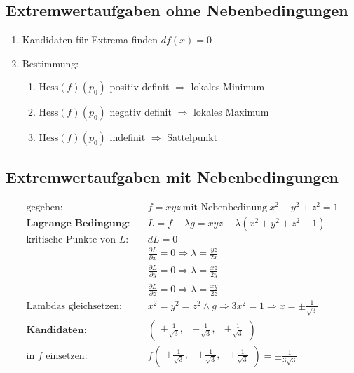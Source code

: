 \documentclass[11pt]{article}
\begin{document}
\subsection{Extremwertaufgaben ohne Nebenbedingungen}

\begin{enumerate}[noitemsep]
	\item Kandidaten für Extrema finden $df(x)=0$
	\item Bestimmung:
	\begin{enumerate}[noitemsep]
		\item $\text{Hess}(f)(p_0)$ positiv definit $\Rightarrow$ lokales Minimum
		\item $\text{Hess}(f)(p_0)$ negativ definit $\Rightarrow$ lokales Maximum
		\item $\text{Hess}(f)(p_0)$ indefinit $\Rightarrow$ Sattelpunkt
	\end{enumerate}
\end{enumerate}

\subsection{Extremwertaufgaben mit Nebenbedingungen}

\begin{equation*}
\begin{split}
	\text{gegeben:} \quad & f = xyz\ \text{mit Nebenbedinung}\ x^2 + y^2 + z^2 = 1 \\
	\textbf{Lagrange-Bedingung:} \quad & L = f - \lambda g = xyz - \lambda(x^2 + y^2 + z^2 - 1) \\
	\text{kritische Punkte von $L$:} \quad & dL = 0 \\
	& \frac{\partial L}{\partial x} = 0 \Rightarrow \lambda = \frac{yz}{2x} \\
	& \frac{\partial L}{\partial y} = 0 \Rightarrow \lambda = \frac{xz}{2y} \\
	& \frac{\partial L}{\partial z} = 0 \Rightarrow \lambda = \frac{xy}{2z} \\
	\text{Lambdas gleichsetzen:} \quad & x^2 = y^2 = z^2 \land g \Rightarrow 3x^2 = 1 \Rightarrow x = \pm \frac{1}{\sqrt{3}} \\
	\textbf{Kandidaten:} \quad & \begin{pmatrix}
		\pm \frac{1}{\sqrt{3}}, & \pm \frac{1}{\sqrt{3}}, & \pm \frac{1}{\sqrt{3}}
	\end{pmatrix} \\
	\text{in $f$ einsetzen:} \quad & f\begin{pmatrix}
		\pm \frac{1}{\sqrt{3}}, & \pm \frac{1}{\sqrt{3}}, & \pm \frac{1}{\sqrt{3}}
	\end{pmatrix} = \pm \frac{1}{3\sqrt{3}}
\end{split}
\end{equation*}
\end{document}
